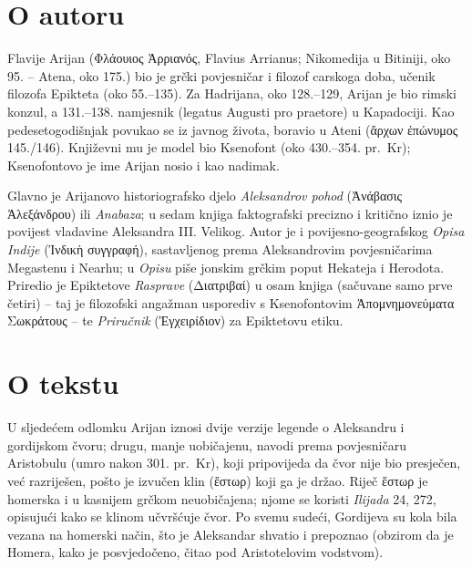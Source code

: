 \section*{O autoru}

Flavije Arijan \textgreek[variant=ancient]{(Φλάουιος Ἀρριανός,} Flavius Arrianus; Nikomedija u Bitiniji, oko 95. – Atena, oko 175.) bio je grčki povjesničar i filozof carskoga doba, učenik filozofa Epikteta (oko 55.–135). Za Hadrijana, oko 128.–129, Arijan je bio rimski konzul, a 131.–138. namjesnik (legatus Augusti pro praetore) u Kapadociji. Kao pedesetogodišnjak povukao se iz javnog života, boravio u Ateni (ἄρχων ἐπώνυμος 145./146). Književni mu je model bio Ksenofont (oko 430.–354. pr.~Kr); Ksenofontovo je ime Arijan nosio i kao nadimak.

Glavno je Arijanovo historiografsko djelo \textit{Aleksandrov pohod} \textgreek[variant=ancient]{(Ἀνάβασις Ἀλεξάνδρου)} ili \textit{Anabaza}; u sedam knjiga faktografski precizno i kritično iznio je povijest vladavine Aleksandra III. Velikog. Autor je i povijesno-geografskog \textit{Opisa Indije} \textgreek[variant=ancient]{(Ἰνδικὴ συγγραφή),} sastavljenog prema Aleksandrovim povjesničarima Megastenu i Nearhu; u \textit{Opisu} piše jonskim grčkim poput Hekateja i Herodota. Priredio je Epiktetove \textit{Rasprave} \textgreek[variant=ancient]{(Διατριβαί)} u osam knjiga (sačuvane samo prve četiri) – taj je filozofski angažman usporediv s Ksenofontovim \textgreek[variant=ancient]{Ἀπομνημονεύματα Σωκράτους} – te \textit{Priručnik} \textgreek[variant=ancient]{(Ἐγχειρίδιον)} za Epiktetovu etiku.

\section*{O tekstu}

U sljedećem odlomku Arijan iznosi dvije verzije legende o Aleksandru i gordijskom čvoru; drugu, manje uobičajenu, navodi prema povjesničaru Aristobulu (umro nakon 301. pr.~Kr), koji pripovijeda da čvor nije bio presječen, već razriješen, pošto je izvučen klin \textgreek[variant=ancient]{(ἕστωρ)} koji ga je držao. Riječ \textgreek[variant=ancient]{ἕστωρ} je homerska i u kasnijem grčkom neuobičajena; njome se koristi \textit{Ilijada} 24, 272, opisujući kako se klinom učvršćuje čvor. Po svemu sudeći, Gordijeva su kola bila vezana na homerski način, što je Aleksandar shvatio i prepoznao (obzirom da je Homera, kako je posvjedočeno, čitao pod Aristotelovim vodstvom). 

